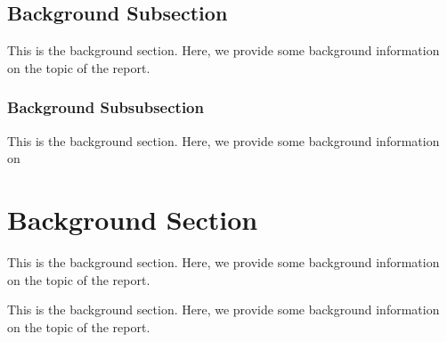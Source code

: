 \documentclass{report}
\begin{document}
\subsection{Background Subsection}

This is the background section. Here, we provide some background information on
the topic of the report.
\subsubsection{Background Subsubsection}
This is the background section. Here, we provide some background information on
\section{Background Section}
This is the background section. Here, we provide some background information on
the topic of the report.

This is the background section. Here, we provide some background information on
the topic of the report.
\end{document}
